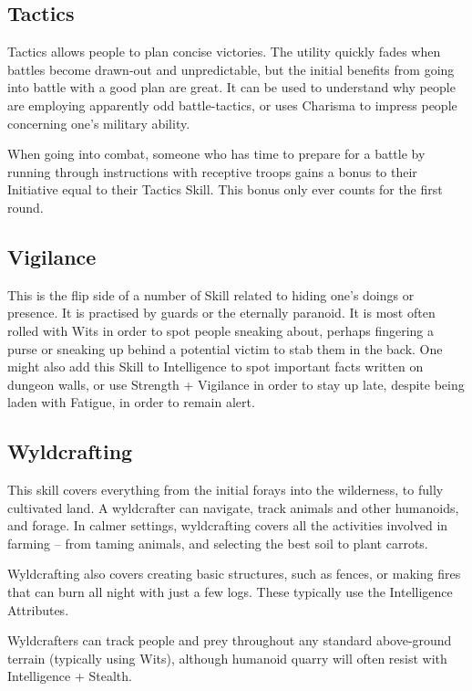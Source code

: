 \begin{multicols}{2}
\subsection{Tactics}

Tactics allows people to plan concise victories.
The utility quickly fades when battles become drawn-out and unpredictable, but the initial benefits from going into battle with a good plan are great.
It can be used to understand why people are employing apparently odd battle-tactics, or uses Charisma to impress people concerning one's military ability.

When going into combat, someone who has time to prepare for a battle by running through instructions with receptive troops gains a bonus to their Initiative equal to their Tactics Skill. This bonus only ever counts for the first \gls{round}.

\subsection{Vigilance}

This is the flip side of a number of Skill related to hiding one's doings or presence.
It is practised by guards or the eternally paranoid.
It is most often rolled with Wits in order to spot people sneaking about, perhaps fingering a purse or sneaking up behind a potential victim to stab them in the back.
One might also add this Skill to Intelligence to spot important facts written on dungeon walls, or use Strength + Vigilance in order to stay up late, despite being laden with Fatigue, in order to remain alert.

\subsection{Wyldcrafting}

This skill covers everything from the initial forays into the wilderness, to fully cultivated land.
A wyldcrafter can navigate, track animals and other humanoids, and forage.
In calmer settings, wyldcrafting covers all the activities involved in farming -- from taming animals, and selecting the best soil to plant carrots.

Wyldcrafting also covers creating basic structures, such as fences, or making fires that can burn all night with just a few logs.
These typically use the Intelligence Attributes.

Wyldcrafters can track people and prey throughout any standard above-ground terrain (typically using Wits), although humanoid quarry will often resist with Intelligence + Stealth.

\end{multicols}

